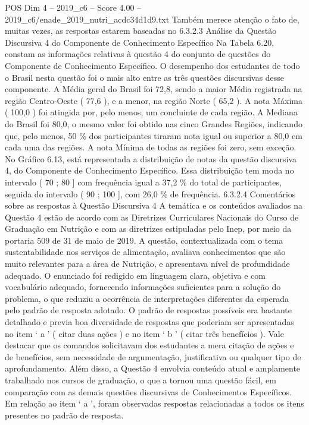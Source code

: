 \begin{textsample}{POS Dim 4 – 2019\_c6 – Score 4.00 – 2019\_c6/enade\_2019\_nutri\_acdc34d1d9.txt}
Também merece atenção o fato de, muitas vezes, as respostas estarem baseadas no 6.3.2.3 Análise da Questão Discursiva 4 do Componente de Conhecimento Específico Na Tabela 6.20, constam as informações relativas à questão 4 do conjunto de questões do Componente de Conhecimento Específico.
O desempenho dos estudantes de todo o Brasil nesta questão foi o mais alto entre as três questões discursivas desse componente.
A Média geral do Brasil foi 72,8, sendo a maior Média registrada na região Centro-Oeste ( 77,6 ), e a menor, na região Norte ( 65,2 ).
A nota Máxima ( 100,0 ) foi atingida por, pelo menos, um concluinte de cada região.
A Mediana do Brasil foi 80,0, o mesmo valor foi obtido nas cinco Grandes Regiões, indicando que, pelo menos, 50 \% dos participantes tiraram nota igual ou superior a 80,0 em cada uma das regiões.
A nota Mínima de todas as regiões foi zero, sem exceção.
No Gráfico 6.13, está representada a distribuição de notas da questão discursiva 4, do Componente de Conhecimento Específico.
Essa distribuição tem moda no intervalo ( 70 ; 80 ] com frequência igual a 37,2 \% do total de participantes, seguida do intervalo ( 90 ; 100 ], com 26,0 \% de frequência. 6.3.2.4 Comentários sobre as respostas à Questão Discursiva 4 A temática e os conteúdos avaliados na Questão 4 estão de acordo com as Diretrizes Curriculares Nacionais do Curso de Graduação em Nutrição e com as diretrizes estipuladas pelo Inep, por meio da portaria 509 de 31 de maio de 2019.
A questão, contextualizada com o tema sustentabilidade nos serviços de alimentação, avaliava conhecimentos que são muito relevantes para a área de Nutrição, e apresentava nível de profundidade adequado.
O enunciado foi redigido em linguagem clara, objetiva e com vocabulário adequado, fornecendo informações suficientes para a solução do problema, o que reduziu a ocorrência de interpretações diferentes da esperada pelo padrão de resposta adotado.
O padrão de respostas possíveis era bastante detalhado e previa boa diversidade de respostas que poderiam ser apresentadas no item ‘ a ’ ( citar duas ações ) e no item ‘ b ’ ( citar três benefícios ).
Vale destacar que os comandos solicitavam dos estudantes a mera citação de ações e de benefícios, sem necessidade de argumentação, justificativa ou qualquer tipo de aprofundamento.
Além disso, a Questão 4 envolvia conteúdo atual e amplamente trabalhado nos cursos de graduação, o que a tornou uma questão fácil, em comparação com as demais questões discursivas de Conhecimentos Específicos.
Em relação ao item ‘ a ’, foram observadas respostas relacionadas a todos os itens presentes no padrão de resposta.

\end{textsample}
